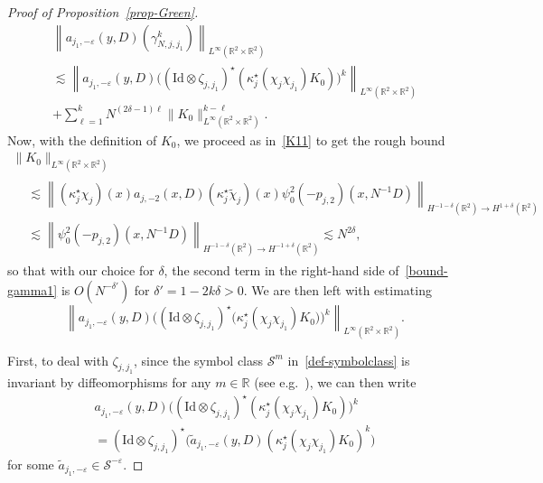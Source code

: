 \documentclass[10pt]{amsart}
\theoremstyle{definition}\newtheorem{defi}[theo]{Definition}\newtheorem{rema}[theo]{Remark}\newtheorem{exam}[theo]{Example}\newtheorem{exem}[theo]{Example}\newtheorem{nota}[theo]{Notation}
\newcommand{\R}{\mathbb{R}}
\renewcommand{\S}{\mathcal{S}}
\newcommand{\Id}{\mathrm{Id}}
\newcommand{\dl}{\delta}
\newcommand{\eps}{\varepsilon}
\newcommand{\kk}{\kappa}
\newcommand{\wt}{\widetilde}
\newcommand{\les}{\lesssim}
\begin{document}
\begin{proof}[Proof of Proposition~\ref{prop-Green}]
\begin{multline}\label{bound-gamma1}
\left\| a_{j_1,-\eps}(y,D)\left(\gamma_{N,j,j_1}^k\right)\right\|_{L^{\infty}\left(\R^2\times\R^2\right)}\\
\les \left\| a_{j_1,-\eps}(y,D)\Big(\left(\Id\otimes\zeta_{j,j_1}\right)^{\star}\left(\kk_j^{\star}\left(\chi_j\chi_{j_1}\right)K_0\right)\Big)^k\right\|_{L^{\infty}(\R^2\times\R^2)}\\
+\sum_{\ell=1}^kN^{(2\dl-1)\ell}\|K_0\|_{L^{\infty}(\R^2\times\R^2)}^{k-\ell}.
\end{multline}
Now, with the definition of $K_0$, we proceed as in~\eqref{K11} to get the rough bound
\begin{multline*}
\|K_0\|_{L^{\infty}(\R^2\times\R^2)}\\
\begin{aligned}
&\les \left\|\left(\kk_j^\star\chi_j\right)(x)a_{j,-2}(x,D)\left(\kk_j^\star\widetilde{\chi}_j\right)(x)\psi_0^2(-p_{j,2})\left(x,N^{-1}D\right)\right\|_{H^{-1-\dl}(\R^2)\to H^{1+\dl}(\R^2)}\\
&\les\left\|\psi_0^2(-p_{j,2})\left(x,N^{-1}D\right)\right\|_{H^{-1-\dl}(\R^2)\to H^{-1+\dl}(\R^2)} \les N^{2\dl},
\end{aligned}
\end{multline*}
so that with our choice for $\dl$, the second term in the right-hand side of~\eqref{bound-gamma1} is $O(N^{-\dl'})$ for $\dl'=1-2k\dl>0$. We are then left with estimating
\begin{equation*}
\left\| a_{j_1,-\eps}(y,D)\Big((\Id\otimes\zeta_{j,j_1})^{\star}\big(\kk_j^{\star}(\chi_j\chi_{j_1})K_0\big)\Big)^k\right\|_{L^{\infty}(\R^2\times\R^2)}.
\end{equation*}

First, to deal with $\zeta_{j,j_1}$, since the symbol class $\S^m$ in~\eqref{def-symbolclass} is invariant by diffeomorphisms for any $m\in\R$ (see e.g.~\cite[Theorem~18.1.17]{HormanderIII}), we can then write
\begin{multline*}
a_{j_1,-\eps}(y,D)\Big(\left(\Id\otimes\zeta_{j,j_1}\right)^{\star}\left(\kk_j^{\star}\left(\chi_j\chi_{j_1}\right)K_0\right)\Big)^k\\
=\left(\Id\otimes\zeta_{j,j_1}\right)^\star\Big(\wt a_{j_1,-\eps}(y,D) \left(\kk_j^{\star}\left(\chi_j\chi_{j_1}\right)K_0\right)^k\Big)
\end{multline*}
for some $\wt a_{j_1,-\eps}\in \S^{-\eps}$.


\end{proof}
\end{document}
